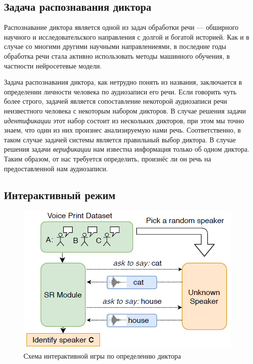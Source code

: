 \subsection{Задача распознавания диктора}

Распознавание диктора является одной из задач обработки речи --- обширного
научного и исследовательского направления с долгой и богатой историей. Как и в
случае со многими другими научными направлениеями, в последние годы обработка
речи стала активно использовать методы машинного обучения, в частности
нейросетевые модели.

Задача распознавания диктора, как нетрудно понять из названия, заключается в
определении личности человека по аудиозаписи его речи. Если говорить чуть
более строго, задачей является сопоставление некоторой аудиозаписи речи
неизвестного человека с некоторым набором дикторов. В случае решения задачи
\emph{идентификации} этот набор состоит из нескольких дикторов, при этом мы
точно знаем, что один из них произнес анализируемую нами речь. Соответственно,
в таком случае задачей системы является правильный выбор диктора. В случае
решения задачи \emph{верификации} нам известна информация только об одном
диктора. Таким образом, от нас требуется определить, произнёс ли он речь на
предоставленной нам аудиозаписи.

\subsection{Интерактивный режим}\label{ssec:isr}

\begin{figure}[htb]
    \centering
    \includegraphics[scale=1.0]{figures/isr_game.png}
    \caption{Схема интерактивной игры по определению диктора \citeisr}
\end{figure}